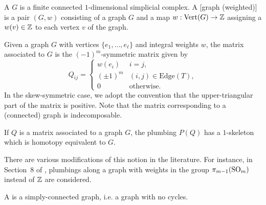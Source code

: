 \begin{definition}
	A  $G$ is a finite connected $1$-dimensional simplicial complex.
	A [graph (weighted)] is a pair $(G,w)$ consisting of a graph $G$ and a map $w : \operatorname{Vert}(G) \to \mathbb{Z}$ assigning a  $w(v)\in \mathbb{Z}$ to each vertex $v$ of the graph.
\end{definition}

Given a graph $G$ with vertices $\{e_1,\ldots, e_\ell\}$ and integral weights $w$, the matrix associated to $G$ is the $(-1)^m$-symmetric matrix given by
\[
	Q_{ij} = \begin{cases}
		w(e_i)    & i=j,                       \\
		(\pm 1)^m & (i,j)\in \textrm{Edge}(T), \\
		0         & \textrm{otherwise}.
	\end{cases}
\]
In the skew-symmetric case, we adopt the convention that the upper-triangular part of the matrix is positive. Note that the matrix corresponding to a (connected) graph is indecomposable.

\begin{remark*}
If $Q$ is a matrix associated to a graph $G$, the plumbing $P(Q)$ has a $1$-skeleton which is homotopy equivalent to $G$.
\end{remark*}

\begin{remark*}
	There are various modifications of this notion in the literature. For instance, in Section~8 of \cite{hirzebruch1971quadratic}, plumbings along a graph with weights in the group $\pi_{m-1}(\mathrm{SO}_m)$ instead of $\mathbb{Z}$ are considered.
\end{remark*}


\begin{definition}
	A  is a simply-connected graph, i.e. a graph with no cycles.
\end{definition}

